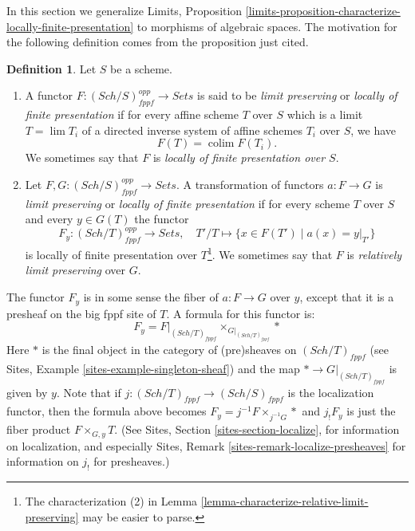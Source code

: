 \documentclass{stacks-project}
\theoremstyle{plain}
\theoremstyle{definition}
\newtheorem{definition}[subsection]{Definition}
\theoremstyle{remark}
\numberwithin{equation}{subsection}
\def\lim{\mathop{\mathrm{lim}}\nolimits}
\def\colim{\mathop{\mathrm{colim}}\nolimits}
\def\Sch{\mathit{Sch}}
\begin{document}
\noindent
In this section we generalize
Limits, Proposition
\ref{limits-proposition-characterize-locally-finite-presentation}
to morphisms of algebraic spaces.
The motivation for the following definition comes from
the proposition just cited.

\begin{definition}
\label{definition-locally-finite-presentation}
Let $S$ be a scheme.
\begin{enumerate}
\item A functor $F : (\Sch/S)_{fppf}^{opp} \to \textit{Sets}$
is said to be {\it limit preserving} or {\it locally of finite presentation} if
for every affine scheme $T$ over $S$ which is a limit $T = \lim T_i$
of a directed inverse system of affine schemes $T_i$ over $S$, we have
$$
F(T) = \colim F(T_i).
$$
We sometimes say that $F$ is {\it locally of finite presentation over $S$}.
\item Let $F, G : (\Sch/S)_{fppf}^{opp} \to \textit{Sets}$.
A transformation of functors $a : F \to G$
is {\it limit preserving} or {\it locally of finite presentation}
if for every scheme $T$ over $S$ and every $y \in G(T)$ the functor
$$
F_y : (\Sch/T)_{fppf}^{opp} \longrightarrow \textit{Sets}, \quad
T'/T \longmapsto \{x \in F(T') \mid a(x) = y|_{T'}\}
$$
is locally of finite presentation over $T$\footnote{The characterization (2) in
Lemma \ref{lemma-characterize-relative-limit-preserving}
may be easier to parse.}. We sometimes say that
$F$ is {\it relatively limit preserving} over $G$.
\end{enumerate}
\end{definition}

\noindent
The functor $F_y$ is in some sense the fiber of
$a : F \to G$ over $y$, except that it is a presheaf on the big fppf
site of $T$. A formula for this functor is:
\begin{equation}
\label{equation-fibre-map-functors}
F_y =
F|_{(\Sch/T)_{fppf}}
{\times}_{G|_{(\Sch/T)_{fppf}}}
*
\end{equation}
Here $*$ is the final object in the category of (pre)sheaves
on $(\Sch/T)_{fppf}$ (see
Sites, Example \ref{sites-example-singleton-sheaf})
and the map $* \to G|_{(\Sch/T)_{fppf}}$ is given by $y$.
Note that if $j : (\Sch/T)_{fppf} \to (\Sch/S)_{fppf}$
is the localization functor, then the formula above becomes
$F_y = j^{-1}F \times_{j^{-1}G} *$ and $j_!F_y$ is just the fiber product
$F \times_{G, y} T$. (See
Sites, Section \ref{sites-section-localize},
for information on localization, and especially
Sites, Remark \ref{sites-remark-localize-presheaves}
for information on $j_!$ for presheaves.)
\end{document}
